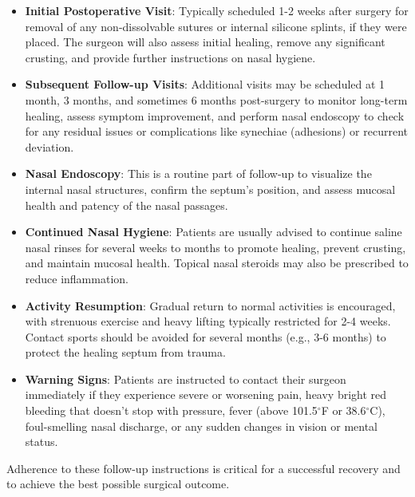 \begin{itemize}
  \item \textbf{Initial Postoperative Visit}: Typically scheduled 1-2 weeks after surgery for removal of any non-dissolvable sutures or internal silicone splints, if they were placed. The surgeon will also assess initial healing, remove any significant crusting, and provide further instructions on nasal hygiene.
  \item \textbf{Subsequent Follow-up Visits}: Additional visits may be scheduled at 1 month, 3 months, and sometimes 6 months post-surgery to monitor long-term healing, assess symptom improvement, and perform nasal endoscopy to check for any residual issues or complications like synechiae (adhesions) or recurrent deviation.
  \item \textbf{Nasal Endoscopy}: This is a routine part of follow-up to visualize the internal nasal structures, confirm the septum's position, and assess mucosal health and patency of the nasal passages.
  \item \textbf{Continued Nasal Hygiene}: Patients are usually advised to continue saline nasal rinses for several weeks to months to promote healing, prevent crusting, and maintain mucosal health. Topical nasal steroids may also be prescribed to reduce inflammation.
  \item \textbf{Activity Resumption}: Gradual return to normal activities is encouraged, with strenuous exercise and heavy lifting typically restricted for 2-4 weeks. Contact sports should be avoided for several months (e.g., 3-6 months) to protect the healing septum from trauma.
  \item \textbf{Warning Signs}: Patients are instructed to contact their surgeon immediately if they experience severe or worsening pain, heavy bright red bleeding that doesn't stop with pressure, fever (above 101.5$^{\circ}$F or 38.6$^{\circ}$C), foul-smelling nasal discharge, or any sudden changes in vision or mental status.
\end{itemize}
Adherence to these follow-up instructions is critical for a successful recovery and to achieve the best possible surgical outcome.

